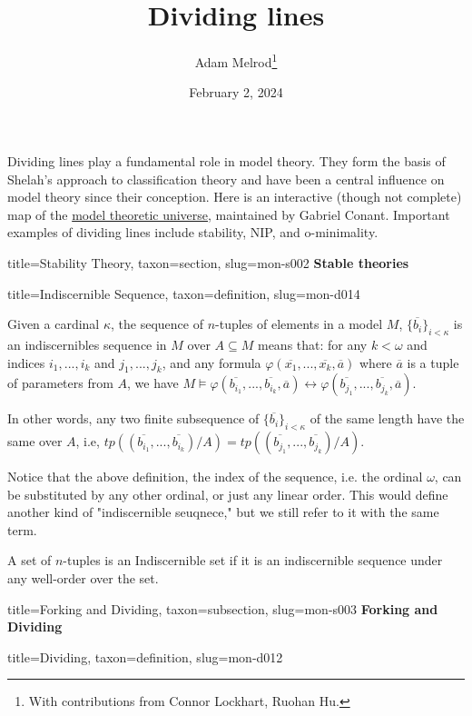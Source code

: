 \documentclass[a4paper]{article}
\title{Dividing lines}
\date{February 2, 2024}
\author{Adam Melrod\thanks{With contributions from Connor Lockhart, Ruohan Hu.}}
\begin{document}
\maketitle
\par{Dividing lines play a fundamental role in model theory. They form the basis of Shelah's approach to classification theory and have been a central influence on model theory since their conception. Here is an interactive (though not complete) map of the \href{https://forkinganddividing.com}{model theoretic universe}, maintained by Gabriel Conant. Important examples of dividing lines include stability, NIP, and o-minimality.}
  
  
\begin{tree}{title={Stability Theory}, taxon={section}, slug={mon-s002}}
\textbf{Stable theories}
\begin{tree}{title={Indiscernible Sequence}, taxon={definition}, slug={mon-d014}}


Given a cardinal \(\kappa\), the sequence of \(n\)-tuples of elements in a model \(M\), \(\{ \overline {b_i} \} _{i< \kappa }\) is an indiscernibles sequence in \(M\) over \(A \subseteq  M\) means that: for any \(k< \omega\) and indices \(i_1,...,i_k\) and \(j_1,...,j_k\), and any formula \(\varphi ( \overline {x_1},..., \overline {x_k}, \overline {a})\) where \(\overline {a}\) is a tuple of parameters from \(A\), we have \(M \models   \varphi ( \overline {b_{i_1}},..., \overline {b_{i_k}}, \overline {a}) \leftrightarrow   \varphi ( \overline {b_{j_1}},..., \overline {b_{j_k}}, \overline {a})\).

In other words, any two finite subsequence of \(\{ \overline {b_i} \} _{i< \kappa }\) of the same length have the same  over \(A\), i.e, \(tp(( \overline {b_{i_1}},..., \overline {b_{i_k}})/A)=tp(( \overline {b_{j_1}},..., \overline {b_{j_k}})/A)\). 

Notice that the above definition, the index of the sequence, i.e. the ordinal \(\omega\), can be substituted by any other ordinal, or just any linear order. This would define another kind of "indiscernible seuqnece," but we still refer to it with the same term.

A set of \(n\)-tuples is an Indiscernible set if it is an indiscernible sequence under any well-order over the set.

\end{tree}

\begin{tree}{title={Forking and Dividing}, taxon={subsection}, slug={mon-s003}}
\textbf{Forking and Dividing}
\begin{tree}{title={Dividing}, taxon={definition}, slug={mon-d012}}


\end{tree}
\end{tree}
\end{tree}
\end{document}

